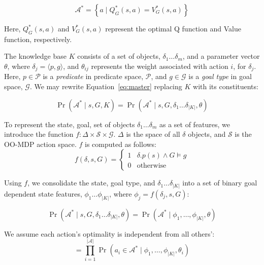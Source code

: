 \documentclass[conference]{IEEEtran}
\begin{document}
\begin{equation}
\mathcal{A}^* = \left\{ a \mid Q^*_G(s,a) = V^*_G(s,a) \right\}
\label{eq:opt_act_set}
\end{equation}

Here, $Q^*_G(s,a)$ and $V^*_G(s,a)$ represent the optimal Q function and 
Value function, respectively.

The knowledge base $K$ consists of a set of objects, $\delta_1 \ldots \delta_m$, and a 
parameter vector $\theta$, where $\delta_j = \langle p, g \rangle$, and $\theta_{ij}$
represents the weight associated with action $i$, for $\delta_j$. Here, $p \in \mathcal{P}$
is a {\it predicate} in predicate space, $\mathcal{P}$, and $g \in \mathcal{G}$ is a {\it goal type}
in goal space, $\mathcal{G}$. We may rewrite Equation~\ref{eq:master} replacing $K$ with
its constituents:

\begin{equation}
\Pr(\mathcal{A}^* \mid s, G, K) = \Pr(\mathcal{A}^* \mid s, G, \delta_1 \ldots \delta_{|K|}, \theta)
\end{equation}

To represent the state, goal, set of objects $\delta_1 \ldots \delta_m$ as a set of features,
we introduce the function $f : \Delta \times \mathcal{S} \times \mathcal{G}$.
$\Delta$ is the space of all $\delta$ objects, and $\mathcal{S}$
is the OO-MDP action space. $f$ is computed as follows:
\begin{equation}
f(\delta, s, G) = 
\begin{cases}
1& \delta.p(s) \wedge G \models g \\
0& \text{otherwise}
\end{cases}
\label{eq:f_func_def}
\end{equation}

Using $f$, we consolidate the state, goal type, and $\delta_1 \ldots \delta_{|K|}$ into a set of binary goal dependent
state features, $\phi_1 \ldots \phi_{|K|}$, where $\phi_j = f(\delta_j, s, G)$:

\begin{equation}
\Pr(\mathcal{A}^* \mid s, G, \delta_1 \ldots \delta_{|K|}, \theta) = \Pr(\mathcal{A}^* \mid \phi_1, \ldots, \phi_{|K|}, \theta)
\label{eq:feature_rep}
\end{equation}

We assume each action's optimality is independent from all others':
\begin{equation}
= \prod_{i=1}^{|\mathcal{A}|} \Pr(a_i \in \mathcal{A}^* \mid \phi_1, \ldots, \phi_{|K|}, \theta_i)
\label{eq:action_independ}
\end{equation}
\end{document}
